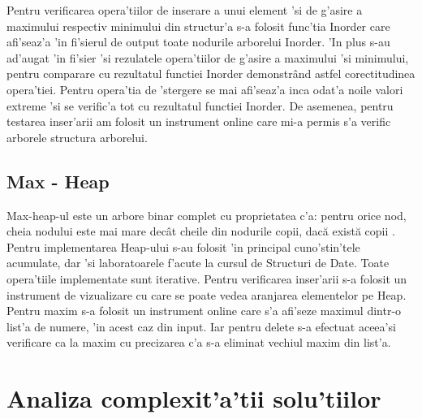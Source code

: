 \newline
\myindent
Pentru verificarea opera'tiilor de inserare a unui element 'si de g'asire a maximului respectiv minimului din structur'a s-a folosit func'tia Inorder care afi'seaz'a 'in fi'sierul de output toate nodurile arborelui Inorder. 'In plus s-au ad'augat 'in fi'sier 'si rezulatele opera'tiilor de g'asire a maximului 'si minimului, pentru comparare cu rezultatul functiei Inorder demonstr\^and astfel corectitudinea opera'tiei. Pentru opera'tia de 'stergere se mai afi'seaz'a inca odat'a noile valori extreme 'si se verific'a tot cu rezultatul functiei Inorder. De asemenea, pentru testarea inser'arii am folosit un instrument online care mi-a permis s'a verific arborele structura arborelui\cite{AVLVisualization}.
\vspace{5 mm}
\subsection{Max - Heap}
Max-heap-ul este un arbore binar complet cu proprietatea c'a: pentru orice nod, cheia nodului este mai mare decât cheile din nodurile copii, dacă există copii \cite{SD}.
\newline
\myindent
Pentru implementarea Heap-ului s-au folosit 'in principal cuno'stin'tele acumulate, dar 'si laboratoarele f'acute la cursul de Structuri de Date\cite{SD}. Toate opera'tiile implementate sunt iterative. 
\newline
\myindent
Pentru verificarea inser'arii s-a folosit un instrument de vizualizare\cite{HeapVisualization} cu care se poate vedea aranjarea elementelor pe Heap. Pentru maxim s-a folosit un instrument online care s'a afi'seze maximul dintr-o list'a de numere, 'in acest caz din input\cite{MaxTool}. Iar pentru delete s-a efectuat aceea'si verificare ca la maxim cu precizarea c'a s-a eliminat vechiul maxim din list'a.
\vspace{5 mm}
\section{Analiza complexit'a'tii solu'tiilor}

